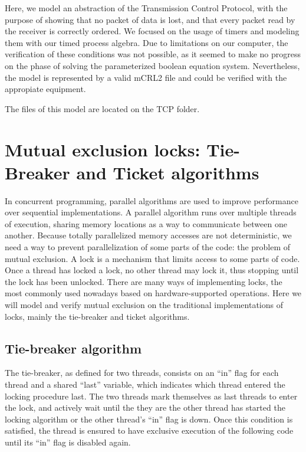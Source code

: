 \documentclass[11pt]{article}
\theoremstyle{definition}
\theoremstyle{plain}
\theoremstyle{definition}
\begin{document}
\begin{appendices}
Here, we model an abstraction of the Transmission Control Protocol, with the purpose of showing that no packet of data is lost, and that every packet read by the receiver is correctly ordered. We focused on the usage of timers and modeling them with our timed process algebra. Due to limitations on our computer, the verification of these conditions was not possible, as it seemed to make no progress on the phase of solving the parameterized boolean equation system. Nevertheless, the model is represented by a valid mCRL2 file and could be verified with the appropiate equipment.

The files of this model are located on the TCP folder.

\section{Mutual exclusion locks: Tie-Breaker and Ticket algorithms}

In concurrent programming, parallel algorithms are used to improve performance over sequential implementations. A parallel algorithm runs over multiple threads of execution, sharing memory locations as a way to communicate between one another. Because totally parallelized memory accesses are not deterministic, we need a way to prevent parallelization of some parts of the code: the problem of mutual exclusion. A lock is a mechanism that limits access to some parts of code. Once a thread has locked a lock, no other thread may lock it, thus stopping until the lock has been unlocked. There are many ways of implementing locks, the most commonly used nowadays based on hardware-supported operations. Here we will model and verify mutual exclusion on the traditional implementations of locks, mainly the tie-breaker and ticket algorithms.

\subsection{Tie-breaker algorithm}
The tie-breaker, as defined for two threads, consists on an ``in'' flag for each thread and a shared ``last'' variable, which indicates which thread entered the locking procedure last. The two threads mark themselves as last threads to enter the lock, and actively wait until the they are the other thread has started the locking algorithm or the other thread's ``in'' flag is down. Once this condition is satisfied, the thread is ensured to have exclusive execution of the following code until its ``in'' flag is disabled again.


\end{appendices}
\end{document}

